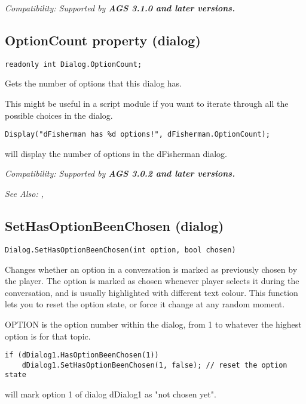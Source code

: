 \it{Compatibility:} Supported by \bf{AGS 3.1.0} and later versions.


\subsection{OptionCount property (dialog)}\label{Dialog.OptionCount}%

\begin{verbatim}
readonly int Dialog.OptionCount;
\end{verbatim}
Gets the number of options that this dialog has.

This might be useful in a script module if you want to iterate through all
the possible choices in the dialog.

\begin{verbatim}
Display("dFisherman has %d options!", dFisherman.OptionCount);
\end{verbatim}
will display the number of options in the dFisherman dialog.

\it{Compatibility:} Supported by \bf{AGS 3.0.2} and later versions.

\it{See Also:} ,

\subsection{SetHasOptionBeenChosen (dialog)}\label{Dialog.SetHasOptionBeenChosen}%

\begin{verbatim}
Dialog.SetHasOptionBeenChosen(int option, bool chosen)
\end{verbatim}
Changes whether an option in a conversation is marked as previously chosen by the player.
The option is marked as chosen whenever player selects it during the conversation,
and is usually highlighted with different text colour. This function lets you to
reset the option state, or force it change at any random moment.

OPTION is the option number within the dialog, from 1 to whatever the
highest option is for that topic.

\begin{verbatim}
if (dDialog1.HasOptionBeenChosen(1))
    dDialog1.SetHasOptionBeenChosen(1, false); // reset the option state
\end{verbatim}
will mark option 1 of dialog dDialog1 as "not chosen yet".

